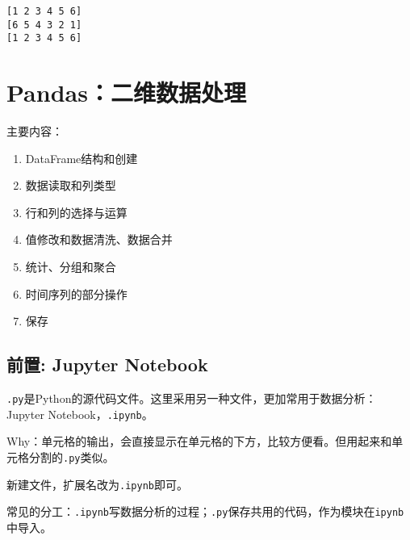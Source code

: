 \documentclass[
  letterpaper,
  DIV=11,
  numbers=noendperiod]{scrreprt}
\providecommand{\tightlist}{%
  \setlength{\itemsep}{0pt}\setlength{\parskip}{0pt}}\usepackage{longtable,booktabs,array}
\begin{document}
\begin{verbatim}
[1 2 3 4 5 6]
[6 5 4 3 2 1]
[1 2 3 4 5 6]
\end{verbatim}

\hypertarget{pandasux4e8cux7ef4ux6570ux636eux5904ux7406}{%
\chapter{Pandas：二维数据处理}\label{pandasux4e8cux7ef4ux6570ux636eux5904ux7406}}

\begin{tcolorbox}[enhanced jigsaw, opacityback=0, left=2mm, coltitle=black, leftrule=.75mm, bottomtitle=1mm, arc=.35mm, opacitybacktitle=0.6, bottomrule=.15mm, breakable, colbacktitle=quarto-callout-note-color!10!white, toprule=.15mm, toptitle=1mm, colframe=quarto-callout-note-color-frame, titlerule=0mm, title=\textcolor{quarto-callout-note-color}{\faInfo}\hspace{0.5em}{Note}, rightrule=.15mm, colback=white]

主要内容：

\begin{enumerate}
\def\labelenumi{\arabic{enumi}.}
\tightlist
\item
  DataFrame结构和创建
\item
  数据读取和列类型
\item
  行和列的选择与运算
\item
  值修改和数据清洗、数据合并
\item
  统计、分组和聚合
\item
  时间序列的部分操作
\item
  保存
\end{enumerate}

\end{tcolorbox}

\hypertarget{ux524dux7f6e-jupyter-notebook}{%
\section{前置: Jupyter Notebook}\label{ux524dux7f6e-jupyter-notebook}}

\texttt{.py}是Python的源代码文件。这里采用另一种文件，更加常用于数据分析：Jupyter
Notebook，\texttt{.ipynb}。

Why：单元格的输出，会直接显示在单元格的下方，比较方便看。但用起来和单元格分割的\texttt{.py}类似。

新建文件，扩展名改为\texttt{.ipynb}即可。

常见的分工：\texttt{.ipynb}写数据分析的过程；\texttt{.py}保存共用的代码，作为模块在\texttt{ipynb}中导入。
\end{document}
